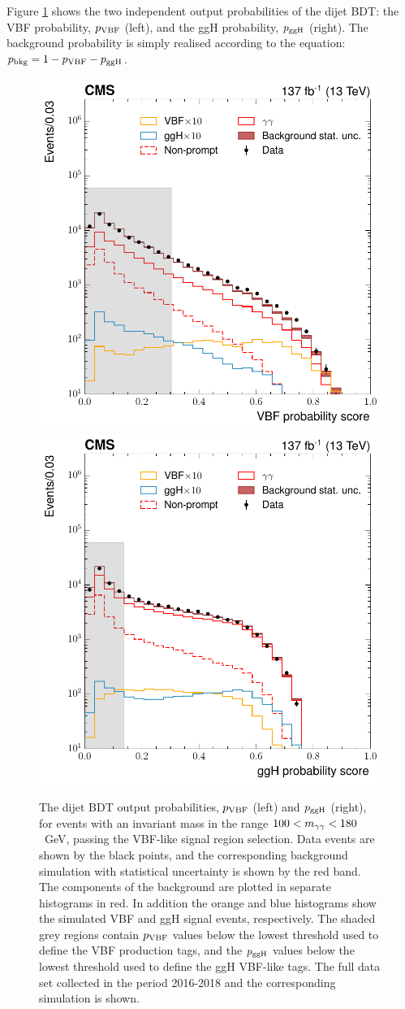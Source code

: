 Figure \ref{fig:dijetbdt_outputs} shows the two independent output probabilities of the dijet BDT: the VBF probability, $p_{\rm{VBF}}$ (left), and the ggH probability, $p_{\rm{ggH}}$ (right). The background probability is simply realised according to the equation: $p_{\rm{bkg}}=1-p_{\rm{VBF}}-p_{\rm{ggH}}$. 

\begin{figure}[hptb]
  \centering
  \includegraphics[width=.49\textwidth]{Figures/hgg_overview/DijetBDT_DD_vbfMvaResult_prob_VBF_logPlot.pdf}
  \includegraphics[width=.49\textwidth]{Figures/hgg_overview/DijetBDT_ggHprob.pdf}
  \caption[Dijet BDT output probabilities: $p_{\rm{VBF}}$ and $p_{\rm{ggH}}$]
  {
    The dijet BDT output probabilities, $p_{\rm{VBF}}$ (left) and $p_{\rm{ggH}}$ (right), for events with an invariant mass in the range $100<m_{\gamma\gamma}<180$~GeV, passing the VBF-like signal region selection. Data events are shown by the black points, and the corresponding background simulation with statistical uncertainty is shown by the red band. The components of the background are plotted in separate histograms in red. In addition the orange and blue histograms show the simulated VBF and ggH signal events, respectively. The shaded grey regions contain $p_{\rm{VBF}}$ values below the lowest threshold used to define the VBF production tags, and the $p_{\rm{ggH}}$ values below the lowest threshold used to define the ggH VBF-like tags. The full data set collected in the period 2016-2018 and the corresponding simulation is shown.
  }
  \label{fig:dijetbdt_outputs}
\end{figure}

